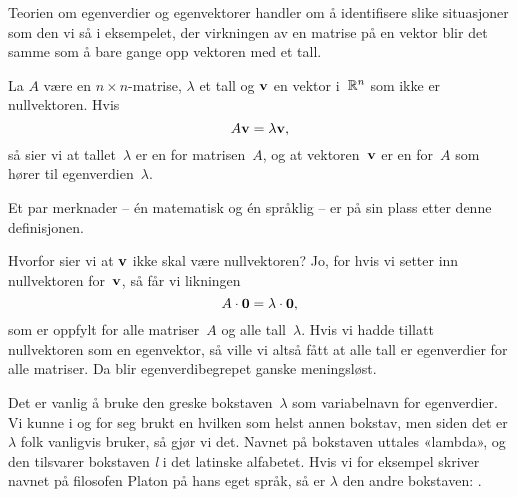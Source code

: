 Teorien om egenverdier og egenvektorer handler om å identifisere slike
situasjoner som den vi så i eksempelet, der virkningen av en matrise
på en vektor blir det samme som å bare gange opp vektoren med et tall.

\begin{defn}
La $A$ være en $n \times n$-matrise, $\lambda$ et tall og $\mathbf{v}$ en
vektor i~$\mathbb{R}^n$ som ikke er nullvektoren.  Hvis
\[
A \mathbf{v} = \lambda \mathbf{v},
\]
så sier vi at tallet~$\lambda$ er en  for
matrisen~$A$, og at vektoren~$\mathbf{v}$ er en 
for~$A$ som hører til egenverdien~$\lambda$.
\end{defn}

Et par merknader -- én matematisk og én språklig -- er på sin plass
etter denne definisjonen.

\begin{merk}
Hvorfor sier vi at $\mathbf{v}$ ikke skal være nullvektoren?  Jo, for hvis
vi setter inn nullvektoren for~$\mathbf{v}$, så får vi likningen
\[
A \cdot \mathbf{0} = \lambda \cdot \mathbf{0},
\]
som er oppfylt for alle matriser~$A$ og alle tall~$\lambda$.  Hvis vi
hadde tillatt nullvektoren som en egenvektor, så ville vi altså fått
at alle tall er egenverdier for alle matriser.  Da blir
egenverdibegrepet ganske meningsløst.
\end{merk}

\begin{merk}
Det er vanlig å bruke den greske bokstaven~$\lambda$ som variabelnavn
for egenverdier.  Vi kunne i og for seg brukt en hvilken som helst
annen bokstav, men siden det er $\lambda$ folk vanligvis bruker, så
gjør vi det.  Navnet på bokstaven uttales «lambda», og den tilsvarer
bokstaven \emph{l} i det latinske alfabetet.
Hvis vi for eksempel
skriver navnet på filosofen Platon på hans eget språk, så er $\lambda$
den andre bokstaven: \textPi\textlambda\textalpha\texttau\textomega\textnu.
\end{merk}

